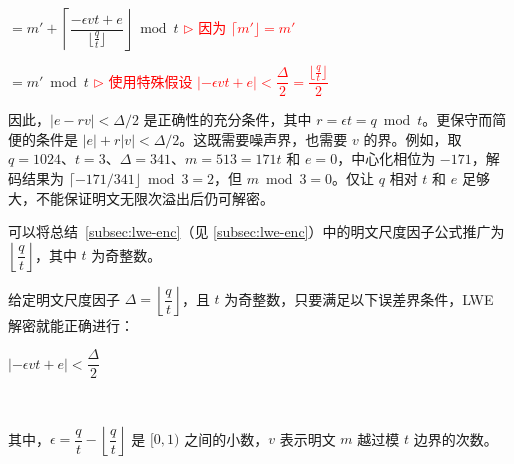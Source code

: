 $= m' + \left\lceil \dfrac{-\epsilon vt + e }{\lfloor\frac{q}{t}\rfloor} \right\rfloor \bmod t$ \textcolor{red}{ $\rhd$ 因为 $\lceil m' \rfloor = m'$}

$= m' \bmod t$ \textcolor{red}{ $\rhd$ 使用特殊假设 $|-\epsilon vt + e| < \dfrac{\Delta}{2} = \dfrac{\lfloor\frac{q}{t}\rfloor}{2}$}

因此，$|e-rv|<\Delta/2$ 是正确性的充分条件，其中 $r=\epsilon t=q\bmod t$。更保守而简便的条件是 $|e|+r|v|<\Delta/2$。这既需要噪声界，也需要 $v$ 的界。例如，取 $q=1024$、$t=3$、$\Delta=341$、$m=513=171t$ 和 $e=0$，中心化相位为 $-171$，解码结果为 $\lceil-171/341\rfloor\bmod3=2$，但 $m\bmod3=0$。仅让 $q$ 相对 $t$ 和 $e$ 足够大，不能保证明文无限次溢出后仍可解密。

可以将总结~\ref*{subsec:lwe-enc}（见 \autoref{subsec:lwe-enc}）中的明文尺度因子公式推广为 $\left\lfloor\dfrac{q}{t}\right\rfloor$，其中 $t$ 为奇整数。


\begin{tcolorbox}[title={\textbf{\tboxlabel{\ref*{subsubsec:lwe-noise-bound}} 奇数明文模数 $\bm{t}$ 下的噪声预算}}]


给定明文尺度因子 $\Delta=\left\lfloor\dfrac{q}{t}\right\rfloor$，且 $t$ 为奇整数，只要满足以下误差界条件，LWE 解密就能正确进行：

$|-\epsilon vt + e| < \dfrac{\Delta}{2}$

$ $

其中，$\epsilon = \dfrac{q}{t} - \left\lfloor\dfrac{q}{t}\right\rfloor$ 是 $[0, 1)$ 之间的小数，$v$ 表示明文 $m$ 越过模 $t$ 边界的次数。

\end{tcolorbox}

